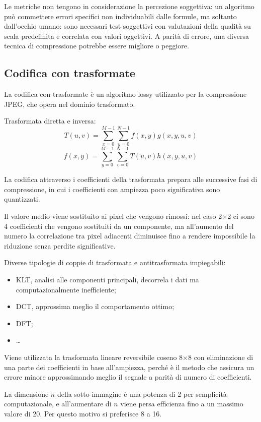 Le metriche non tengono in considerazione la percezione soggettiva: un algoritmo può commettere errori specifici non individuabili dalle formule, ma soltanto dall'occhio umano: sono necessari test soggettivi con valutazioni della qualità su scala predefinita e correlata con valori oggettivi. A parità di errore, una diversa tecnica di compressione potrebbe essere migliore o peggiore. 

\subsection{Codifica con trasformate}
La codifica con trasformate è un algoritmo lossy utilizzato per la compressione JPEG, che opera nel dominio trasformato. 

Trasformata diretta e inversa:
$$T(u, v) =  \sum_{x=0}^{M-1} \sum_{y=0}^{N-1} f(x, y) g(x, y, u, v)$$
$$f(x, y) = \sum_{y=0}^{M-1} \sum_{v=0}^{N-1} T(u, v) h(x, y, u, v)$$

La codifica attraverso i coefficienti della trasformata prepara alle successive fasi di compressione, in cui i coefficienti con ampiezza poco significativa sono quantizzati.

Il valore medio viene sostituito ai pixel che vengono rimossi: nel caso 2$\times$2 ci sono 4 coefficienti che vengono sostituiti da un componente, ma all'aumento del numero la correlazione tra pixel adiacenti diminuisce fino a rendere impossibile la riduzione senza perdite significative.

Diverse tipologie di coppie di trasformata e antitrasformata impiegabili:
\begin{itemize}
	\item KLT, analisi alle componenti principali, decorrela i dati ma computazionalmente inefficiente;
	\item DCT, approssima meglio il comportamento ottimo; 
	\item DFT;
	\item \dots
\end{itemize}

Viene utilizzata la trasformata lineare reversibile coseno 8$\times$8 con eliminazione di una parte dei coefficienti in base all'ampiezza, perché è il metodo che assicura un errore minore approssimando meglio il segnale a parità di numero di coefficienti. 

La dimensione $n$ della sotto-immagine è una potenza di 2 per semplicità computazionale, e all'aumentare di $n$ viene persa efficienza fino a un massimo valore di 20. Per questo motivo si preferisce 8 a 16.

